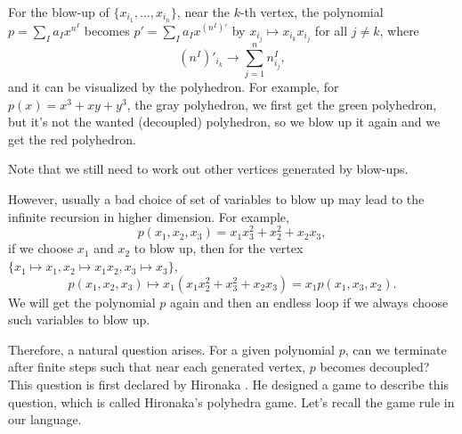 \documentclass[12pt]{article}
\theoremstyle{definition}
\theoremstyle{plain}
\begin{document}
For the blow-up of $\{x_{i_1},\dots,x_{i_n}\}$, near the $k$-th vertex, 
the polynomial $p=\sum_I a_I x^{n^I}$ becomes 
$p'=\sum_I a_I x^{(n^I)'}$ by $x_{i_j}\mapsto x_{i_k}x_{i_j}$ for all $j\neq k$, where
\[
	(n^I)'_{i_k}\longrightarrow \sum_{j=1}^n n^I_{i_j},
\]
and it can be visualized by the polyhedron.
For example, for $p(x)=x^3+xy+y^3$, the gray polyhedron, we first get the green polyhedron, 
but it's not the wanted (decoupled) polyhedron, so we blow up it again and we get the red polyhedron.
\begin{center}
\end{center}
Note that we still need to work out other vertices generated by blow-ups. 

However, usually a bad choice of set of variables to blow up may lead to the
infinite recursion in higher dimension.
For example, 
\[
	p(x_1,x_2,x_3)=x_1x_3^2+x_2^2+x_2x_3,
\]
if we choose $x_1$ and $x_2$ to blow up, then for the vertex 
$\{x_1\mapsto x_1, x_2\mapsto x_1x_2, x_3\mapsto x_3\}$,
\[
	p(x_1,x_2,x_3)\mapsto x_1(x_1x_2^2+x_3^2+x_2x_3)=x_1 p(x_1,x_3,x_2).
\]
We will get the polynomial $p$ again and then an endless loop if we always choose such
variables to blow up.

Therefore, a natural question arises. For a given polynomial $p$, 
can we terminate after finite steps such that near each generated vertex, $p$ becomes 
decoupled? This question is first declared by Hironaka \cite{hironaka1967}. 
He designed a game to describe this question, which is 
called Hironaka's polyhedra game. Let's recall the game rule in our language.
\end{document}
